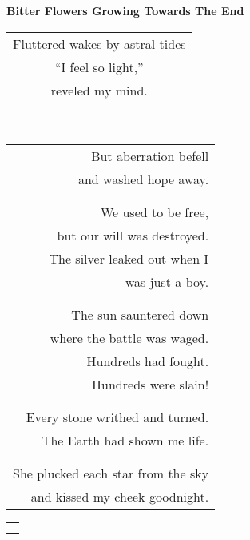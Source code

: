 \documentclass{article}
\begin{document}
\begin{center}
\textbf{Bitter Flowers Growing Towards The End} \\
\begin{tabular}{c}
\\
Fluttered wakes by astral tides \\
``I feel so light,'' \\
reveled my mind. \\
\end{tabular} \\
\begin{tabular}{r}
\\
But aberration befell \\
and washed hope away. \\
\\
\\
We used to be free, \\
but our will\hspace{2ex} was destroyed. \\
The silver leaked out\hspace{2ex} when I \\
was just a boy. \\
\\
\\
The sun sauntered down \\
where the battle was waged. \\
Hundreds had fought. \\
Hundreds were slain! \\
\\
\\
Every stone writhed and turned. \\
The Earth had shown me life. \\
\\
\\
She plucked each star from the sky \\
and kissed my cheek goodnight. \\
\end{tabular}
\begin{tabular}{l}
\\
\\
\\

\end{tabular}
\end{center}
\end{document}

